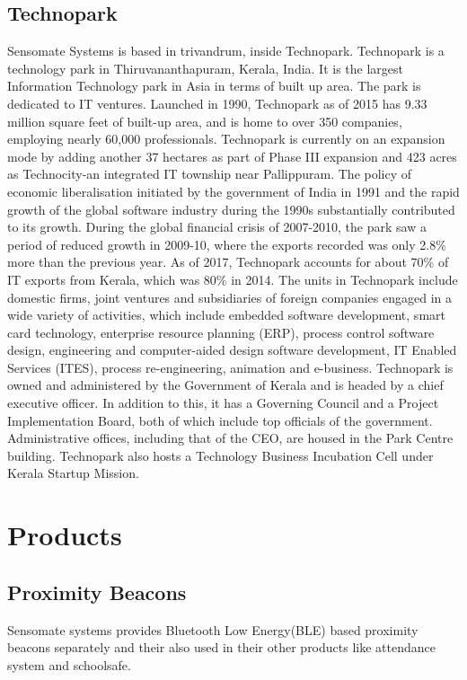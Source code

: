 \documentclass[a4paper,12pt]{report}
\begin{document}
			\subsection{Technopark}
			Sensomate Systems is based in trivandrum, inside Technopark. Technopark is a technology park in Thiruvananthapuram, Kerala, India. It is the largest Information Technology park in Asia in terms of built up area. The park is dedicated to IT ventures. Launched in 1990, Technopark as of 2015 has 9.33 million square feet of built-up area, and is home to over 350 companies, employing nearly 60,000 professionals. Technopark is currently on an expansion mode by adding another 37 hectares as part of Phase III expansion and 423 acres as Technocity-an integrated IT township near Pallippuram. The policy of economic liberalisation initiated by the government of India in 1991 and the rapid growth of the global software industry during the 1990s substantially contributed to its growth. During the global financial crisis of 2007-2010, the park saw a period of reduced growth in 2009-10, where the exports recorded was only 2.8\% more than the previous year. As of 2017, Technopark accounts for about 70\% of IT exports from Kerala, which was 80\% in 2014.
			The units in Technopark include domestic firms, joint ventures and subsidiaries of foreign companies engaged in a wide variety of activities, which include embedded software development, smart card technology, enterprise resource planning (ERP), process control software design, engineering and computer-aided design software development, IT Enabled Services (ITES), process re-engineering, animation and e-business. Technopark is owned and administered by the Government of Kerala and is headed by a chief executive officer. In addition to this, it has a Governing Council and a Project Implementation Board, both of which include top officials of the government. Administrative offices, including that of the CEO, are housed in the Park Centre building. Technopark also hosts a Technology Business Incubation Cell under Kerala Startup Mission.
		\newpage
		\section{Products}
			\subsection{Proximity Beacons}
			Sensomate systems provides Bluetooth Low Energy(BLE) based proximity beacons separately and their also used in their other products like attendance system and schoolsafe.
\end{document}
